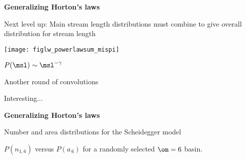 \begin{frame}[label=]
\begin{frame}[label=]
\begin{frame}[label=]
\begin{frame}[label=]
\begin{frame}[label=]
\begin{frame}[label=]
\begin{frame}[label=]
\begin{frame}[label=]
\begin{frame}[label=]
\begin{frame}[label=]
\begin{frame}[label=]
\begin{frame}[label=]
\begin{frame}[label=]
\begin{frame}[label=]
\begin{frame}[label=]
\begin{frame}[label=]
\begin{frame}[label=]
\begin{frame}[label=]
\begin{frame}[label=]
\begin{frame}[label=]
\begin{frame}[label=]
\begin{frame}[label=]
\begin{frame}[label=]
\begin{frame}[label=]
\begin{frame}[label=]
\begin{frame}[label=]
\begin{frame}[label=]
\begin{frame}[label=]
\begin{frame}[label=]
\begin{frame}[label=]
\begin{frame}[label=]
\begin{frame}[label=]
\begin{frame}[label=]
\begin{frame}[label=]
\begin{frame}[label=]
\begin{frame}[label=]
\begin{frame}[label=]
\begin{frame}[label=]
\begin{frame}[label=]
\begin{frame}[label=]
\begin{frame}[label=]
\begin{frame}[label=]
\begin{frame}[label=]
\begin{frame}[label=]
\begin{frame}[label=]
\begin{frame}[label=]
\begin{frame}[label=]
\begin{frame}[label=]
  \textbf{Generalizing Horton's laws}

  
   Next level up: Main stream length distributions must
    combine to give overall distribution for stream length
  
      
    \texttt{[image: figlw\_powerlawsum\_mispi]}    
    
    
     
      $ P(\msl) \sim \msl^{-\gamma} $ 
     
      Another round of convolutions\cite{dodds2001b}
     
      Interesting...
    

    



\begin{frame}[label=]
  \textbf{Generalizing Horton's laws}

      
    
     
      Number and area distributions for the Scheidegger model\cite{dodds2001b}
     
      $P(n_{1,6})$ versus $P(a_{\, 6})$
      for a randomly selected $\om=6$ basin.
    

\end{frame}
\end{frame}
\end{frame}
\end{frame}
\end{frame}
\end{frame}
\end{frame}
\end{frame}
\end{frame}
\end{frame}
\end{frame}
\end{frame}
\end{frame}
\end{frame}
\end{frame}
\end{frame}
\end{frame}
\end{frame}
\end{frame}
\end{frame}
\end{frame}
\end{frame}
\end{frame}
\end{frame}
\end{frame}
\end{frame}
\end{frame}
\end{frame}
\end{frame}
\end{frame}
\end{frame}
\end{frame}
\end{frame}
\end{frame}
\end{frame}
\end{frame}
\end{frame}
\end{frame}
\end{frame}
\end{frame}
\end{frame}
\end{frame}
\end{frame}
\end{frame}
\end{frame}
\end{frame}
\end{frame}
\end{frame}
\end{frame}
